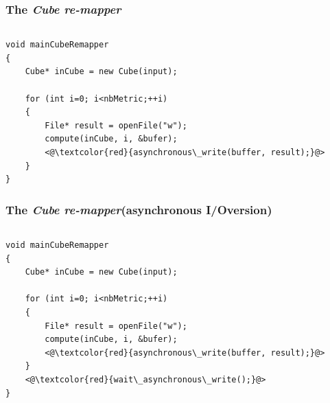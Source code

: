 \documentclass[slidestop,xcolor=dvipsnames, notes=hide]{beamer}
\newcommand{\toolTargetSoftware}			{\emph{Cube re-mapper}}
\newcommand{\notationIO}					{I/O}
\newcommand{\notationaio}					{asynchronous \notationIO}
\begin{document}
		\begin{frame}
			\frametitle{The \toolTargetSoftware}
			\begin{columns}[T]
				\begin{column}{.5\textwidth}
					\begin{minipage}[b]{0.6\textwidth}%
						\lst
					\end{minipage}
				\end{column}
				\begin{column}{.5\textwidth}
				\end{column}
			\end{columns}
		\end{frame}


		\defverbatim[colored]
		\lst
		{
			\begin{lstlisting}[tabsize=2,basicstyle=\ttfamily]
void mainCubeRemapper
{
    Cube* inCube = new Cube(input);

    for (int i=0; i<nbMetric;++i)
    {
        File* result = openFile("w");
        compute(inCube, i, &bufer);
        <@\textcolor{red}{asynchronous\_write(buffer, result);}@>
    }
}
			\end{lstlisting}
		}

		\begin{frame}
			\frametitle{The \toolTargetSoftware\space (\notationaio\space version)}
			\begin{columns}[T]
				\begin{column}{.5\textwidth}
					\begin{minipage}[b]{0.6\textwidth}%
						\lst
					\end{minipage}
				\end{column}
				\begin{column}{.5\textwidth}
				\end{column}
			\end{columns}
		\end{frame}


		\lst
		{
			\begin{lstlisting}[tabsize=2,basicstyle=\ttfamily]
void mainCubeRemapper
{
    Cube* inCube = new Cube(input);

    for (int i=0; i<nbMetric;++i)
    {
        File* result = openFile("w");
        compute(inCube, i, &bufer);
        <@\textcolor{red}{asynchronous\_write(buffer, result);}@>
    }
    <@\textcolor{red}{wait\_asynchronous\_write();}@>
}
			\end{lstlisting}
		}
\end{document}
